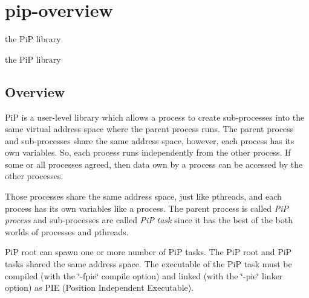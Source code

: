 \hypertarget{group__pip-overview}{\section{pip-\/overview}
\label{group__pip-overview}
}


the Pi\-P library  


the Pi\-P library \hypertarget{group__pip-overview_overview}{}\subsection{Overview}\label{group__pip-overview_overview}
Pi\-P is a user-\/level library which allows a process to create sub-\/processes into the same virtual address space where the parent process runs. The parent process and sub-\/processes share the same address space, however, each process has its own variables. So, each process runs independently from the other process. If some or all processes agreed, then data own by a process can be accessed by the other processes.

Those processes share the same address space, just like pthreads, and each process has its own variables like a process. The parent process is called {\itshape Pi\-P} {\itshape process} and sub-\/processes are called {\itshape Pi\-P} {\itshape task} since it has the best of the both worlds of processes and pthreads.

Pi\-P root can spawn one or more number of Pi\-P tasks. The Pi\-P root and Pi\-P tasks shared the same address space. The executable of the Pi\-P task must be compiled (with the \char`\"{}-\/fpie\char`\"{} compile option) and linked (with the \char`\"{}-\/pie\char`\"{} linker option) as P\-I\-E (Position Independent Executable).

